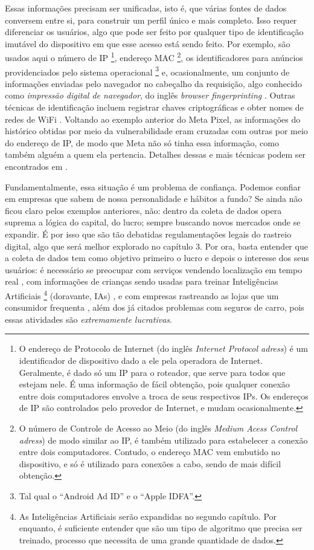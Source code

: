 Essas informações precisam ser unificadas, isto é, que várias fontes de dados conversem entre si, para construir um perfil único e mais completo.
Isso requer diferenciar os usuários, algo que pode ser feito por qualquer tipo de identificação imutável do dispositivo em que esse acesso está sendo feito.
Por exemplo, são usados aqui o número de IP \footnote{O endereço de Protocolo de Internet (do inglês \textit{Internet Protocol adress}) é um identificador de dispositivo dado a ele pela operadora de Internet. Geralmente, é dado só um IP para o roteador, que serve para todos que estejam nele. É uma informação de fácil obtenção, pois qualquer conexão entre dois computadores envolve a troca de seus respectivos IPs. Os endereços de IP são controlados pelo provedor de Internet, e mudam ocasionalmente.}, endereço MAC \footnote{O número de Controle de Acesso ao Meio (do inglês \textit{Medium Acess Control adress}) de modo similar ao IP, é também utilizado para estabelecer a conexão entre dois computadores. Contudo, o endereço MAC vem embutido no dispositivo, e só é utilizado para conexões a cabo, sendo de mais difícil obtenção.}, os identificadores para anúncios providenciados pelo sistema operacional \footnote{Tal qual o {``Android Ad ID''} e o {``Apple IDFA''}.} e, ocasionalmente, um conjunto de informações enviadas pelo navegador no cabeçalho da requisição, algo conhecido como \textit{impressão digital de navegador}, do inglês \textit{browser fingerprinting} \cite{ohm_broken_2009, chen_fingerprinting_2019}.
Outras técnicas de identificação incluem registrar chaves criptográficas \cite{sy_tracking_2018} e obter nomes de redes de WiFi \cite{binder_republican_2019}.
Voltando ao exemplo anterior do Meta Pixel, as informações do histórico obtidas por meio da vulnerabilidade eram cruzadas com outras por meio do endereço de IP, de modo que Meta não só tinha essa informação, como também alguém a quem ela pertencia.
Detalhes dessas e mais técnicas podem ser encontrados em \textcite{cyphers_oneway_2019}.

Fundamentalmente, essa situação é um problema de confiança.
Podemos confiar em empresas que sabem de nossa personalidade e hábitos a fundo?
Se ainda não ficou claro pelos exemplos anteriores, não: dentro da coleta de dados opera suprema a lógica do capital, do lucro; sempre buscando novos mercados onde se expandir.
É por isso que são tão debatidas regulamentações legais do rastreio digital, algo que será melhor explorado no capítulo 3.
Por ora, basta entender que a coleta de dados tem como objetivo primeiro o lucro e depois o interesse dos seus usuários: é necessário se preocupar com serviços vendendo localização em tempo real \cite{mackey_eff_2019}, com informações de crianças sendo usadas para treinar Inteligências Artificiais \footnote{As Inteligências Artificiais serão expandidas no segundo capítulo. Por enquanto, é suficiente entender que são um tipo de algoritmo que precisa ser treinado, processo que necessita de uma grande quantidade de dados.} (doravante, IAs) \cite{schurig_meta_2024}, e com empresas rastreando as lojas que um consumidor frequenta \cite{soltani_privacy_2015}, além dos já citados problemas com seguros de carro, pois essas atividades são \textit{extremamente lucrativas}.

